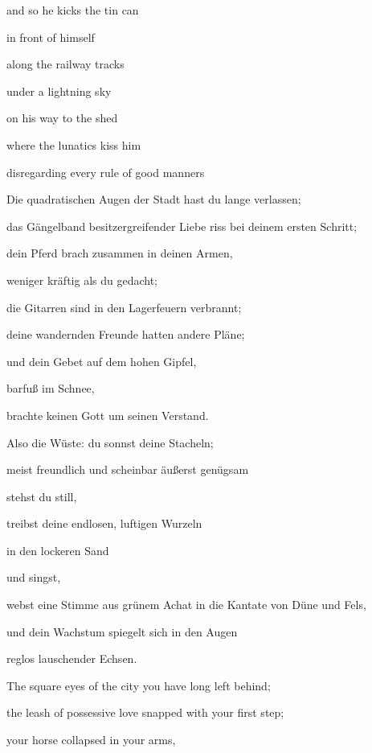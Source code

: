 \documentclass[a4paper]{article}
\begin{document}
and so he kicks the tin can

in front of himself

along the railway tracks

under a lightning sky

on his way to the shed


\bigskip

where the lunatics kiss him

disregarding every rule of good manners


\bigskip



\bigskip

Die quadratischen Augen der Stadt hast du lange verlassen;

das Gängelband besitzergreifender Liebe riss bei deinem ersten Schritt;

dein Pferd brach zusammen in deinen Armen,

weniger kräftig als du gedacht;

die Gitarren sind in den Lagerfeuern verbrannt;

deine wandernden Freunde hatten andere Pläne;

und dein Gebet auf dem hohen Gipfel,

barfuß im Schnee,

brachte keinen Gott um seinen Verstand.


\bigskip

Also die Wüste: du sonnst deine Stacheln;

meist freundlich und scheinbar äußerst genügsam

stehst du still,

treibst deine endlosen, luftigen Wurzeln

in den lockeren Sand

und singst,

webst eine Stimme aus grünem Achat in die Kantate von Düne und Fels,

und dein Wachstum spiegelt sich in den Augen

reglos lauschender Echsen.


\bigskip



\bigskip

The square eyes of the city you have long left behind;

the leash of possessive love snapped with your first step;

your horse collapsed in your arms,
\end{document}

